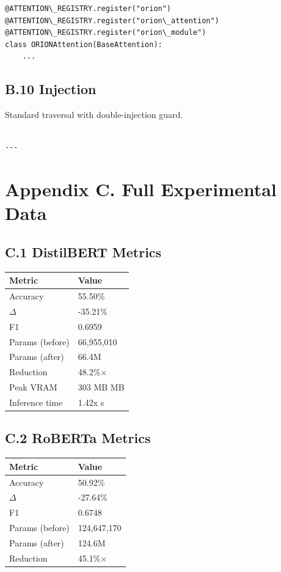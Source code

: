 \begin{lstlisting}
@ATTENTION\_REGISTRY.register("orion")
@ATTENTION\_REGISTRY.register("orion\_attention")
@ATTENTION\_REGISTRY.register("orion\_module")
class ORIONAttention(BaseAttention):
    ...
\end{lstlisting}

\subsection{B.10 Injection}

Standard traversal with double-injection guard.
\begin{lstlisting}

---
\end{lstlisting}


\section{Appendix C. Full Experimental Data}

\subsection{C.1 DistilBERT Metrics}

\begin{table}[H]
\centering
\small
\begin{tabular}{ll}
\toprule
\textbf{Metric} & \textbf{Value} \\
\midrule
Accuracy & 55.50\% \\
$\Delta$ & -35.21\% \\
F1 & 0.6959 \\
Params (before) & 66,955,010 \\
Params (after) & 66.4M \\
Reduction & 48.2\%$\times$ \\
Peak VRAM & 303 MB MB \\
Inference time & 1.42x s \\
\bottomrule
\end{tabular}
\end{table}

\subsection{C.2 RoBERTa Metrics}

\begin{table}[H]
\centering
\small
\begin{tabular}{ll}
\toprule
\textbf{Metric} & \textbf{Value} \\
\midrule
Accuracy & 50.92\% \\
$\Delta$ & -27.64\% \\
F1 & 0.6748 \\
Params (before) & 124,647,170 \\
Params (after) & 124.6M \\
Reduction & 45.1\%$\times$ \\
\bottomrule
\end{tabular}
\end{table}

